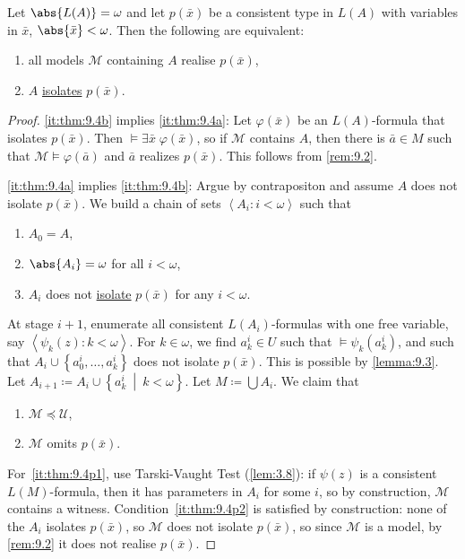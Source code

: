 \documentclass{article}
\let\models\vDash
\newcommand{\M}{\mathcal{M}}
\newcommand{\U}{\mathcal{U}}
\begin{document}
\begin{nthm} \label{thm:9.4} 
Let $\abs{L(A)} = \omega$ and let $p(\bar{x})$ be a consistent type in $L(A)$ with variables in $\bar{x}$, $\abs{\bar x} < \omega$. Then the following are equivalent:
\begin{enumerate}[label=(\roman*)]
\item all models $\M$ containing $A$ realise $p(\bar x)$, \label{it:thm:9.4a}
\item $A$ \hyperlink{def:isolate}{isolates} $p(\bar x)$. \label{it:thm:9.4b}
\end{enumerate}
\end{nthm}
\begin{proof}
\ref{it:thm:9.4b} implies \ref{it:thm:9.4a}: Let $\varphi(\bar x)$ be an $L(A)$-formula that isolates $p(\bar x)$. Then $\models \exists \bar{x} \; \varphi(\bar x)$, so if $\M$ contains $A$, then there is $\bar a \in M$ such that $\M \models \varphi(\bar{a})$ and $\bar{a}$ realizes $p(\bar{x})$.
This follows from \cref{rem:9.2}.

\ref{it:thm:9.4a} implies \ref{it:thm:9.4b}: Argue by contrapositon and assume $A$ does not isolate $p(\bar x)$. We build a chain of sets $\left< A_i : i < \omega \right>$ such that
\begin{enumerate}[label=(\roman*)]
\item $A_0 = A$,
\item $\abs{A_i} = \omega$ for all $i < \omega$,
\item $A_i$ does not \hyperlink{def:isolate}{isolate} $p(\bar{x})$ for any $i < \omega$.
\end{enumerate}
At stage $i+1$, enumerate all consistent $L(A_i)$-formulas with one free variable, say $\left< \psi_k(z) : k < \omega \right>$. For $k \in \omega$, we find $a_k^i \in U$ such that $\models \psi_k(a_k^i)$, and such that $A_i \cup \left\{ a_0^i, \dots, a_k^i\right\}$ does not isolate $p(\bar x)$. This is possible by \cref{lemma:9.3}. Let $A_{i+1} \coloneqq A_i \cup \left\{ a_k^i\ \middle|\ k < \omega \right\}$. Let $M \coloneqq \bigcup A_i$. We claim that
\begin{enumerate}[label=(\alph*)]
\item $\M \preccurlyeq \U$, \label{it:thm:9.4p1}
\item $\M$ omits $p(\bar x)$. \label{it:thm:9.4p2}
\end{enumerate}
For~\ref{it:thm:9.4p1}, use Tarski-Vaught Test (\cref{lem:3.8}): if $\psi(z)$ is a consistent $L(M)$-formula, then it has parameters in $A_i$ for some $i$, so by construction, $\M$ contains a witness. Condition~\ref{it:thm:9.4p2} is satisfied by construction: none of the $A_i$ isolates $p(\bar{x})$, so $\M$ does not isolate $p(\bar x)$, so since $\M$ is a model, by \cref{rem:9.2} it does not realise $p(\bar{x})$.
\end{proof}
\end{document}
